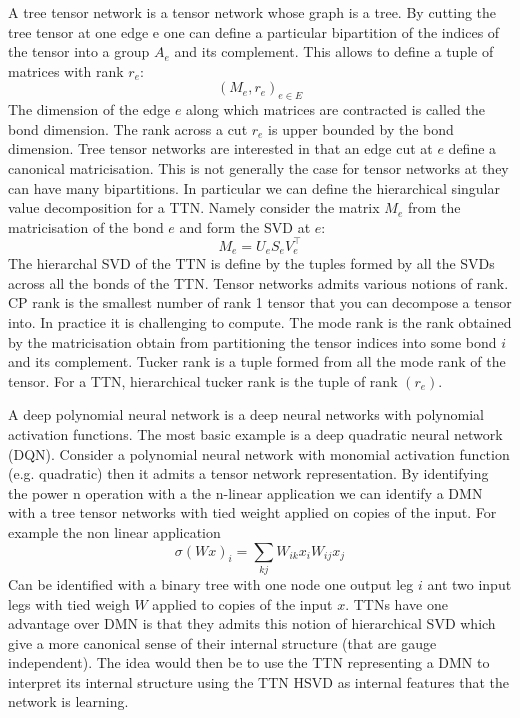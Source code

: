 \documentclass{article}
\theoremstyle{definition}
\begin{document}
A tree tensor network is a tensor network whose graph is a tree. By cutting the tree tensor at one edge e one can define a particular bipartition of the indices of the tensor into a group $A_e$ and its complement. This allows to define a tuple of matrices with rank $r_e$:
\[
(M_e, r_e)_{e\in E}
\]
The dimension of the edge $e$ along which matrices are contracted is called the bond dimension. The rank across a cut $r_e$ is upper bounded by the bond dimension. Tree tensor networks are interested in that an edge cut at $e$ define a canonical matricisation. This is not generally the case for tensor networks at they can have many bipartitions. In particular we can define the hierarchical singular value decomposition for a TTN. Namely consider the matrix $M_e$ from the matricisation of the bond $e$ and form the SVD at $e$:
\[
M_e = U_eS_eV_e^{\top}
\]
The hierarchal SVD of the TTN is define by the tuples formed by all the SVDs across all the bonds of the TTN. 
Tensor networks admits various notions of rank. CP rank is the smallest number of rank 1 tensor that you can decompose a tensor into. In practice it is challenging to compute. The mode rank is the rank obtained by the matricisation obtain from partitioning the tensor indices into some bond $i$ and its complement. Tucker rank is a tuple formed from all the mode rank of the tensor. For a TTN, hierarchical tucker rank is the tuple of rank $(r_e)$.

A deep polynomial neural network is a deep neural networks with polynomial activation functions. The most basic example is a deep quadratic neural network (DQN). Consider a polynomial neural network with monomial activation function (e.g. quadratic) then it admits a tensor network representation. By identifying the power n operation with a the n-linear application we can identify a DMN with a tree tensor networks with tied weight applied on copies of the input. For example the non linear application
\[
\sigma(Wx)_i = \sum_{kj} W_{ik}x_iW_{ij}x_j
\]
Can be identified with a binary tree with one node one output leg $i$ ant two input legs with tied weigh $W$ applied to copies of the input $x$. TTNs have one advantage over DMN is that they admits this notion of hierarchical SVD which give a more canonical sense of their internal structure (that are gauge independent). The idea would then be to use the TTN representing a DMN to interpret its internal structure using the TTN HSVD as internal features that the network is learning. 
\end{document}
